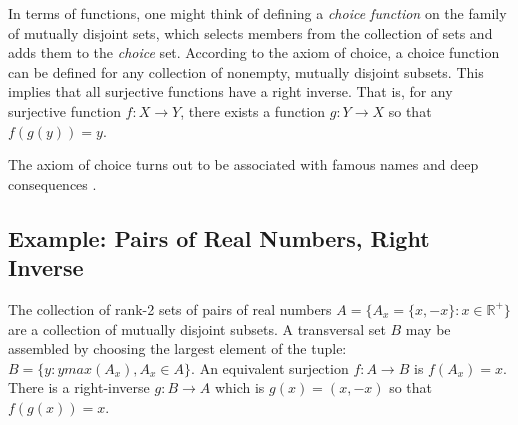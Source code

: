 In terms of functions, one might think of defining a \textit{choice function} on the family of mutually disjoint sets, which selects members from the collection of sets and adds them to the \textit{choice} set. According to the axiom of choice, a choice function can be defined for any collection of nonempty, mutually disjoint subsets. This implies that all surjective functions have a right inverse. That is, for any surjective function $f:X\rightarrow Y$, there exists a function $g:Y\rightarrow X$ so that $f(g(y)) = y$.   

The axiom of choice turns out to be associated with famous names and deep consequences \cite{stanfordaxiomofchoice}.

\subsection{Example: Pairs of Real Numbers, Right Inverse}
The collection of rank-2 sets of pairs of real numbers $A= \{ A_x = \{x,-x\} : x\in \mathbb{R}^{+}\}$ are a collection of mutually disjoint subsets. A transversal set $B$ may be assembled by choosing the largest element of the tuple: $B = \{y : y max(A_x), A_x \in A \}$. An equivalent surjection $f:A\rightarrow B$ is $f(A_x) = x$. There is a right-inverse $g:B\rightarrow A$ which is $g(x) = (x,-x)$ so that $f(g(x)) = x$.







